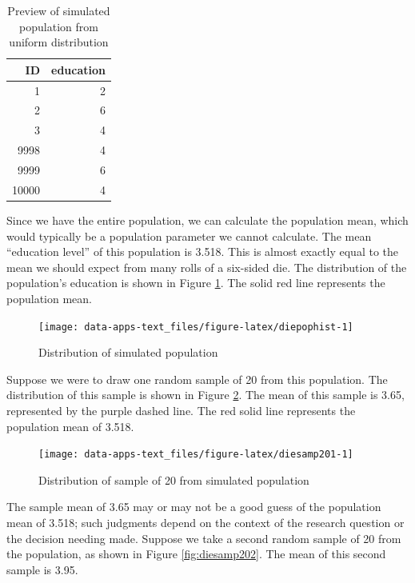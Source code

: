 \documentclass[
]{book}
\begin{document}
\begin{table}

\caption{\label{tab:diepop}Preview of simulated population from uniform distribution}
\centering
\begin{tabular}[t]{r|r}
\hline
ID & education\\
\hline
1 & 2\\
\hline
2 & 6\\
\hline
3 & 4\\
\hline
9998 & 4\\
\hline
9999 & 6\\
\hline
10000 & 4\\
\hline
\end{tabular}
\end{table}

Since we have the entire population, we can calculate the population mean, which would typically be a population parameter we cannot calculate. The mean ``education level'' of this population is 3.518. This is almost exactly equal to the mean we should expect from many rolls of a six-sided die. The distribution of the population's education is shown in Figure \ref{fig:diepophist}. The solid red line represents the population mean.

\begin{figure}

{\centering \texttt{[image: data-apps-text\_files/figure-latex/diepophist-1]} 

}

\caption{Distribution of simulated population}\label{fig:diepophist}
\end{figure}

Suppose we were to draw one random sample of 20 from this population. The distribution of this sample is shown in Figure \ref{fig:diesamp201}. The mean of this sample is 3.65, represented by the purple dashed line. The red solid line represents the population mean of 3.518.

\begin{figure}

{\centering \texttt{[image: data-apps-text\_files/figure-latex/diesamp201-1]} 

}

\caption{Distribution of sample of 20 from simulated population}\label{fig:diesamp201}
\end{figure}

The sample mean of 3.65 may or may not be a good guess of the population mean of 3.518; such judgments depend on the context of the research question or the decision needing made. Suppose we take a second random sample of 20 from the population, as shown in Figure \ref{fig:diesamp202}. The mean of this second sample is 3.95.
\end{document}
